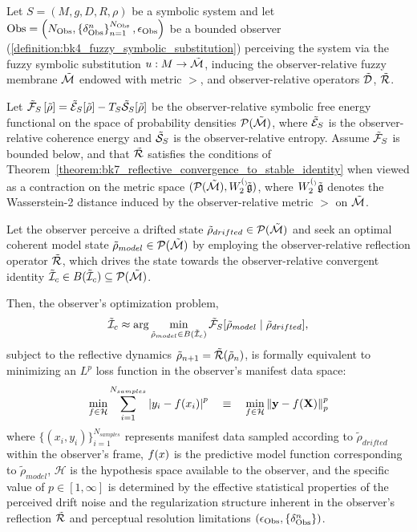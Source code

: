 \begin{theorem}
\label{theorem:bk7_observer_relative_free_energy_minimization_as_lp_regression} 
Let $S = (M, g, D, R, \rho)$ be a symbolic system and let 
$\mathrm{Obs} = \left(N_{\mathrm{Obs}}, \left\{ \delta^{n}_{\mathrm{Obs}} \right\}_{n=1}^{N_{\mathrm{Obs}}}, \epsilon_{\mathrm{Obs}} \right)$ 
be a bounded observer (\ref{definition:bk4_fuzzy_symbolic_substitution}) perceiving the system via the fuzzy symbolic substitution 
$u : M \to \tilde{\mathcal{M}}$, inducing the observer-relative fuzzy membrane $\tilde{\mathcal{M}}$ endowed with metric $\gt$, and observer-relative operators $\tilde{\mathcal{D}}$, $\tilde{\mathcal{R}}$.

Let $\tilde{\mathcal{F}}_S\left[ \tilde{\rho} \right] = \tilde{\mathcal{E}}_S[\tilde{\rho}] - T_S \tilde{\mathcal{S}}_S[\tilde{\rho}]$ be the observer-relative symbolic free energy functional on the space of probability densities $\mathcal{P}(\tilde{\mathcal{M}})$, where $\tilde{\mathcal{E}}_S$ is the observer-relative coherence energy and $\tilde{\mathcal{S}}_S$ is the observer-relative entropy. Assume $\tilde{\mathcal{F}}_S$ is bounded below, and that $\tilde{\mathcal{R}}$ satisfies the conditions of Theorem~\ref{theorem:bk7_reflective_convergence_to_stable_identity} when viewed as a contraction on the metric space $(\mathcal{P}(\tilde{\mathcal{M}}), W_2^{(_)}{\! \tilde{\mathfrak{g}}})$, where $W_2^{(_)}{\tilde{\mathfrak{g}}}$ denotes the Wasserstein-2 distance induced by the observer-relative metric $\gt$ on $\tilde{\mathcal{M}}$.

Let the observer perceive a drifted state $\tilde{\rho}_{drifted} \in \mathcal{P}(\tilde{\mathcal{M}})$ and seek an optimal coherent model state $\tilde{\rho}_{model} \in \mathcal{P}(\tilde{\mathcal{M}})$ by employing the observer-relative reflection operator $\tilde{\mathcal{R}}$, which drives the state towards the observer-relative convergent identity $\tilde{\mathcal{I}}_c \in B(\tilde{\mathcal{I}}_c) \subseteq \mathcal{P}(\tilde{\mathcal{M}})$.

Then, the observer's optimization problem,
\[
\tilde{\mathcal{I}}_c \approx \arg\min_{\tilde{\rho}_{model} \in B(\tilde{\mathcal{I}}_c)} \tilde{\mathcal{F}}_S[ \tilde{\rho}_{model} \mid \tilde{\rho}_{drifted} ],
\]
subject to the reflective dynamics $\tilde{\rho}_{n+1} = \tilde{\mathcal{R}}(\tilde{\rho}_n)$, is formally equivalent to minimizing an $L^p$ loss function in the observer's manifest data space:
\[
\min_{f \in \mathcal{H}} \sum_{i=1}^{N_{samples}} \left|y_i - f(x_i)\right|^p \quad \equiv \quad \min_{f \in \mathcal{H}} \left\|\mathbf{y} - f(\mathbf{X})\right\|_p^p
\]
where $\{(x_i, y_i)\}_{i=1}^{N_{samples}}$ represents manifest data sampled according to $\tilde{\rho}_{drifted}$ within the observer's frame, $f(x)$ is the predictive model function corresponding to $\tilde{\rho}_{model}$, $\mathcal{H}$ is the hypothesis space available to the observer, and the specific value of $p \in [1, \infty]$ is determined by the effective statistical properties of the perceived drift noise and the regularization structure inherent in the observer's reflection $\tilde{\mathcal{R}}$ and perceptual resolution limitations $(\epsilon_{\mathrm{Obs}}, \{\delta^n_{\mathrm{Obs}}\})$.


\end{theorem}
